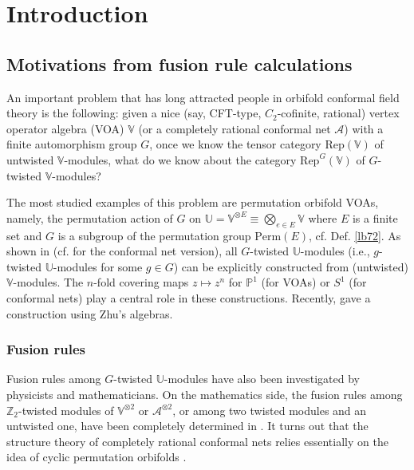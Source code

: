 \documentclass[11pt,b5paper,notitlepage]{article}
\theoremstyle{definition}
\theoremstyle{plain}
\newcommand{\mc}{\mathcal}
\newcommand{\Rep}{\mathrm{Rep}}
\newcommand{\Vbb}{\mathbb V}
\newcommand{\Ubb}{\mathbb U}
\newcommand{\Zbb}{\mathbb Z}
\newcommand{\Pbb}{\mathbb P}
\newcommand{\Perm}{\mathrm{Perm}}
\numberwithin{equation}{subsection}
\begin{document}
	
\newpage




\section{Introduction}

\subsection{Motivations from fusion rule calculations}
An important problem that has long attracted people in orbifold conformal field theory is the following: given a nice (say, CFT-type, $C_2$-cofinite,  rational) vertex operator algebra (VOA) $\Vbb$ (or a completely rational conformal net $\mc A$) with a finite automorphism group $G$, once we know the tensor category $\Rep(\Vbb)$ of untwisted $\Vbb$-modules, what do we know about   the category $\Rep^G(\Vbb)$ of $G$-twisted $\Vbb$-modules?

The most studied examples of this problem are permutation orbifold VOAs, namely, the permutation action of $G$ on $\Ubb=\Vbb^{\otimes E}\equiv\bigotimes_{e\in E}\Vbb$ where $E$ is a finite set and $G$ is a subgroup of the permutation group $\Perm(E)$, cf. Def. \ref{lb72}. As shown in \cite{BHS98,BDM02} (cf. \cite{LX04,KLX05} for the conformal net version), all $G$-twisted $\Ubb$-modules (i.e., $g$-twisted $\Ubb$-modules for some $g\in G$) can be explicitly constructed from (untwisted) $\Vbb$-modules. The $n$-fold covering maps $z\mapsto z^n$ for $\Pbb^1$ (for VOAs) or $S^1$ (for conformal nets) play a central role in these constructions. Recently, \cite{DXY21} gave a construction using Zhu's algebras. 


\subsubsection*{Fusion rules}

Fusion rules among $G$-twisted $\Ubb$-modules have also been investigated by physicists \cite{BHS98,Ban98,Ban02} and mathematicians. On the mathematics side, the fusion rules among $\Zbb_2$-twisted modules of $\Vbb^{\otimes 2}$ or $\mc A^{\otimes 2}$, or among two twisted modules and an untwisted one, have been completely determined in \cite{LX04,KLX05,DLXY24}. It turns out that the structure theory of completely rational conformal nets relies essentially on the idea of  cyclic permutation orbifolds \cite{KLM01,LX04}.
\end{document}
